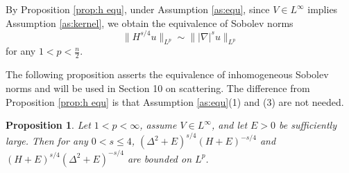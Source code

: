 \documentclass[11pt,a4paper]{article}
\numberwithin{equation}{section}
\newtheorem{proposition}[theorem]{Proposition}
\begin{document}
By Proposition \ref{prop:h equ}, under Assumption \ref{as:equ}, since $V \in L^{\infty}$ implies Assumption \ref{as:kernel}, we obtain the equivalence of Sobolev norms
\[\|H^{s/4}u\|_{L^{p}} \sim \||\nabla|^{s}u\|_{L^{p}} \]
for any $1 < p < \frac{n}{2}$.

The following proposition asserts the equivalence of inhomogeneous Sobolev norms and will be used in Section 10 on scattering. The difference from Proposition \ref{prop:h equ} is that Assumption \ref{as:equ}(1) and (3) are not needed.

\begin{proposition}\label{prop:inh:sobolev}
Let $1 < p < \infty$, assume $V \in L^{\infty}$, and let $E > 0$ be sufficiently large. Then for any $0 < s \leq 4$,
$(\Delta^{2} + E)^{s/4}(H + E)^{-s/4}$ and $(H + E)^{s/4}(\Delta^{2}+E)^{-s/4}$ are bounded on $L^{p}$.
\end{proposition}
\end{document}
